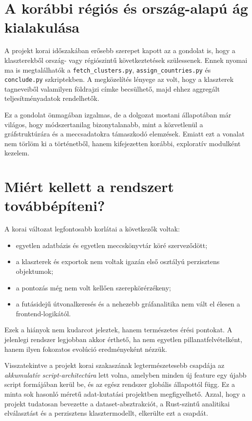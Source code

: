 ﻿\documentclass[a4paper,12pt]{report}
\begin{document}
\section{A korábbi régiós és ország-alapú ág kialakulása}

A projekt korai időszakában erősebb szerepet kapott az a gondolat is, hogy a klaszterekből ország- vagy régiószintű következtetések szülessenek. Ennek nyomai ma is megtalálhatók a \texttt{fetch\_clusters.py}, \texttt{assign\_countries.py} és \texttt{conclude.py} szkriptekben. A megközelítés lényege az volt, hogy a klaszterek tagneveiből valamilyen földrajzi címke becsülhető, majd ehhez aggregált teljesítményadatok rendelhetők.

Ez a gondolat önmagában izgalmas, de a dolgozat mostani állapotában már világos, hogy módszertanilag bizonytalanabb, mint a közvetlenül a gráfstruktúrára és a meccsadatokra támaszkodó elemzések. Emiatt ezt a vonalat nem törlöm ki a történetből, hanem kifejezetten korábbi, exploratív modulként kezelem.

\section{Miért kellett a rendszert továbbépíteni?}

A korai változat legfontosabb korlátai a következők voltak:

\begin{itemize}
    \item egyetlen adatbázis és egyetlen meccskönyvtár köré szerveződött;
    \item a klaszterek és exportok nem voltak igazán első osztályú perzisztens objektumok;
    \item a pontozás még nem volt kellően szerepkörérzékeny;
    \item a futásidejű útvonalkeresés és a nehezebb gráfanalitika nem vált el élesen a frontend-logikától.
\end{itemize}

Ezek a hiányok nem kudarcot jeleztek, hanem természetes érési pontokat. A jelenlegi rendszer legjobban akkor érthető, ha nem egyetlen pillanatfelvételként, hanem ilyen fokozatos evolúció eredményeként nézzük.

Visszatekintve a projekt korai szakaszának legtermészetesebb csapdája az \emph{akkumulatív script-architectúra} lett volna, amelyben minden új feature egy újabb script formájában kerül be, és az egész rendszer globális állapottól függ. Ez a minta sok hasonló méretű adat-kutatási projektben megfigyelhető. Azzal, hogy a projekt tudatosan bevezette a dataset-absztrakciót, a Rust-szintű analitikai elválasztást és a perzisztens klasztermodellt, elkerülte ezt a csapdát.
\end{document}
